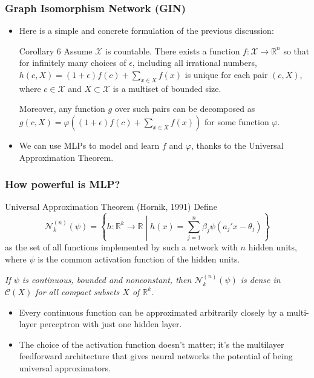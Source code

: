 \documentclass{beamer}
\begin{document}
\begin{frame}
\frametitle{Graph Isomorphism Network (GIN)}

\begin{itemize}

	\item Here is a simple and concrete formulation of the previous discussion:
	
\begin{block}{Corollary 6}
Assume $\mathcal{X}$ is countable.
There exists a function $f : \mathcal{X} \rightarrow \mathbb{R}^n$ so that for infinitely many choices of $\epsilon$, including all irrational numbers, $h(c, X) = (1 + \epsilon) f(c) + \sum_{x \in X} f(x)$ is unique for each pair $(c, X)$, where $c \in \mathcal{X}$ and $X \subset \mathcal{X}$ is a multiset of bounded size.

Moreover, any function $g$ over such pairs can be decomposed as $g(c, X) = \varphi \left( (1 + \epsilon) f(c) + \sum_{x \in X} f(x) \right)$ for some function $\varphi$.
\end{block} \pause

	\item We can use MLPs to model and learn $f$ and $\varphi$, thanks to the Universal Approximation Theorem.
\end{itemize}

\end{frame}

\begin{frame}
\frametitle{How powerful is MLP?}

\begin{block}{Universal Approximation Theorem (Hornik, 1991)}
Define
$$\mathscr{N}_k^{(n)} (\psi) = \left\{ h : \mathbb{R}^k \rightarrow \mathbb{R} \middle| h(x) = \sum_{j = 1}^n \beta_j \psi(a_j' x - \theta_j) \right\}$$
as the set of all functions implemented by such a network with $n$ hidden units, where $\psi$ is the common activation function of the hidden units.

{\it If $\psi$ is continuous, bounded and nonconstant, then $\mathscr{N}_k^{(n)} (\psi)$ is dense in $\mathscr{C}(X)$ for all compact subsets $X$ of $\mathbb{R}^k$.}
\end{block} \pause

\begin{itemize}
	\item Every continuous function can be approximated arbitrarily closely by a multi-layer perceptron with just one hidden layer. \pause
	
	\item The choice of the activation function doesn't matter; it's the multilayer feedforward architecture that gives neural networks the potential of being universal approximators.
\end{itemize}

\end{frame}
\end{document}
